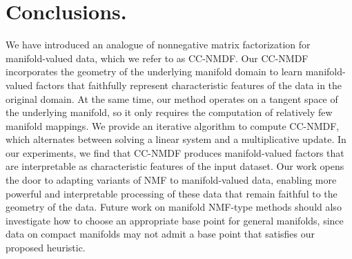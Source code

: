 \section{Conclusions.}
\label{sec:conclusions}
We have introduced an analogue of nonnegative matrix factorization for manifold-valued data, which we refer to as CC-NMDF. Our CC-NMDF incorporates the geometry of the underlying manifold domain to learn manifold-valued factors that faithfully represent characteristic features of the data in the original domain. At the same time, our method operates on a tangent space of the underlying manifold, so it only requires the computation of relatively few manifold mappings. We provide an iterative algorithm to compute CC-NMDF, which alternates between solving a linear system and a multiplicative update. In our experiments, we find that CC-NMDF produces manifold-valued factors that are interpretable as characteristic features of the input dataset. Our work opens the door to adapting variants of NMF to manifold-valued data, enabling more powerful and interpretable processing of these data that remain faithful to the geometry of the data. Future work on manifold NMF-type methods should also investigate how to choose an appropriate base point for general manifolds, since data on compact manifolds may not admit a base point that satisfies our proposed heuristic. 
